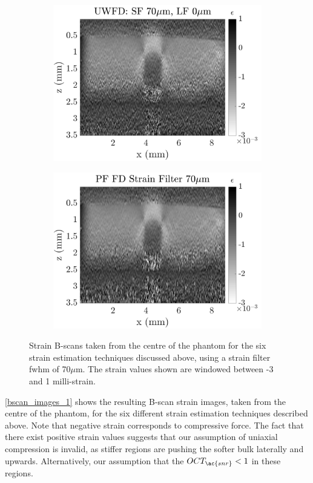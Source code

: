 \begin{figure}[b!]
\begin{subfigure}{0.49\textwidth}
        \includegraphics[width=\textwidth]{figures/uwfd_fr70_lr0.png}
	\end{subfigure}
    \begin{subfigure}{0.49\textwidth}
    	\centering
        \includegraphics[width=\textwidth]{figures/fdsm_fr70_lr0.png}
    \end{subfigure}
	\caption{Strain B-scans taken from the centre of the phantom for the six strain estimation techniques discussed above, using a strain filter \ac{fwhm} of 70$\mu$m. The strain values shown are windowed between -3 and 1 milli-strain.}
    \label{bscan_images_1}	
\end{figure}

\autoref{bscan_images_1} shows the resulting B-scan strain images, taken from the centre of the phantom, for the six different strain estimation techniques described above. Note that negative strain corresponds to compressive force. The fact that there exist positive strain values suggests that our assumption of uniaxial compression is invalid, as stiffer regions are pushing the softer bulk laterally and upwards. Alternatively, our assumption that the $OCT_{\ac{snr}}<1$ in these regions.

